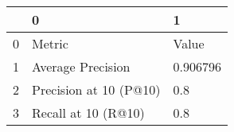 \begin{tabular}{lll}
\toprule
{} &                       0 &         1 \\
\midrule
0 &                  Metric &     Value \\
1 &       Average Precision &  0.906796 \\
2 &  Precision at 10 (P@10) &       0.8 \\
3 &     Recall at 10 (R@10) &       0.8 \\
\bottomrule
\end{tabular}
